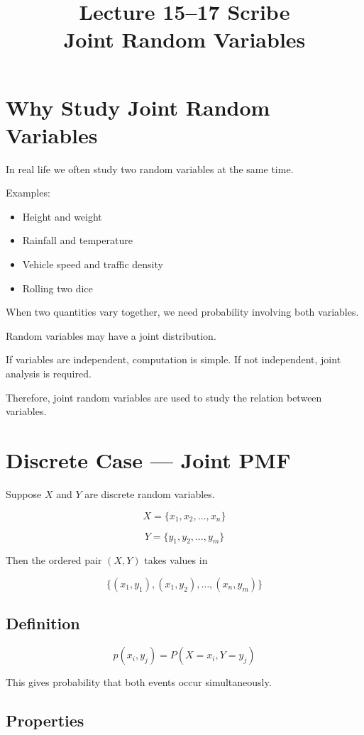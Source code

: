 \documentclass[12pt]{article}
\title{Lecture 15--17 Scribe \\ Joint Random Variables}
\author{}
\date{}
\begin{document}
\maketitle

\section{Why Study Joint Random Variables}

In real life we often study two random variables at the same time.

Examples:
\begin{itemize}
\item Height and weight
\item Rainfall and temperature
\item Vehicle speed and traffic density
\item Rolling two dice
\end{itemize}

When two quantities vary together, we need probability involving both variables.

Random variables may have a joint distribution.

If variables are independent, computation is simple.
If not independent, joint analysis is required.

Therefore, joint random variables are used to study the relation between variables.


\section{Discrete Case --- Joint PMF}

Suppose $X$ and $Y$ are discrete random variables.

\[
X = \{x_1, x_2, \dots , x_n\}
\]

\[
Y = \{y_1, y_2, \dots , y_m\}
\]

Then the ordered pair $(X,Y)$ takes values in

\[
\{(x_1,y_1), (x_1,y_2), \dots , (x_n,y_m)\}
\]

\subsection{Definition}

\[
p(x_i,y_j) = P(X=x_i , Y=y_j)
\]

This gives probability that both events occur simultaneously.

\subsection{Properties}
\end{document}
